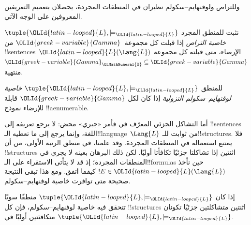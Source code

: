 \documentclass[../../../include/open-logic-section]{subfiles}
\begin{document}


وللتراص ولوفنهايم--سكولم نظيران في المنطقات المجردة، يحصلان بتعميم
التعريفين المعروفين على الوجه الآتي.

\begin{defn}
نثبت للمنطق المجرد $\tuple{{\OLId{latin-looped}{L}},\models_{\OLId{latin-looped}{L}}}$ \emph{خاصية التراص} إذا قبلت كل
مجموعة~${\OLId{greek-variable}{Gamma}}$ من !!{sentence}s~${\OLId{latin-looped}{L}}(\Lang{L})$ الإرضاء، متى قبلته
كل مجموعة ${\OLId{greek-variable}{Gamma}}_{\OLMathNumeral{0}} \subseteq {\OLId{greek-variable}{Gamma}}$ منتهية.
\end{defn}

\begin{defn}
للمنطق $\tuple{{\OLId{latin-looped}{L}},\models_{\OLId{latin-looped}{L}}}$ \emph{خاصية لوفنهايم--سكولم النزولية} إذا
كان لكل ${\OLId{greek-variable}{Gamma}}$ قابلة للإرضاء نموذج !!a{enumerable}.
\end{defn}


أما التشاكل الجزئي المعرّف في  فأمر «جبري» محض:
لا يرجع تعريفه إلى !!{sentence}s اللغة، وإنما يرجع إلى ما تعطيه
الـ!!{language}~$\Lang{L}$ من ثوابت للـ!!{structure}s. فلا يمتنع استعماله
في المنطقات المجردة. وقد علمنا، في منطق الرتبة الأولى، من
 أن !!{structure}s اثنتين إذا تشاكلتا جزئيًا
تكافأتا أوليًا. لكن ذلك البرهان بعينه لا يجري في المنطقات المجردة؛ إذ قد لا يتأتى
الاستقراء على الـ!!{formula}s حين نأخذ $!E \in {\OLId{latin-looped}{L}}(\Lang{L})$
كيفما اتفق. ومع هذا تبقى النتيجة صحيحة متى توافرت خاصية لوفنهايم--سكولم.

\begin{thm}
إذا كان $\tuple{{\OLId{latin-looped}{L}},\models_{\OLId{latin-looped}{L}}}$ منطقًا سويًا تتحقق فيه خاصية لوفنهايم--سكولم،
فإن كل !!{structure}s اثنتين متشاكلتين جزئيًا تكونان متكافئتين أوليًا في
$\tuple{{\OLId{latin-looped}{L}},\models_{\OLId{latin-looped}{L}}}$.
\end{thm}
\end{document}
